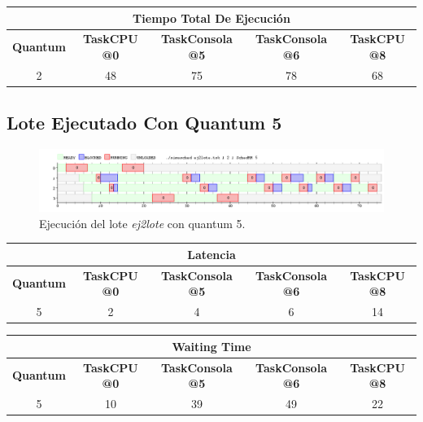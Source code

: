 \begin{center}
	\begin{tabular}{|c|c|c|c|c|}
		\hline
		\multicolumn{5}{|c|}{\large{\textbf{Tiempo Total De Ejecución}}} \\
		\hline
		\textbf{Quantum} & \textbf{TaskCPU @0} & \textbf{TaskConsola @5} & \textbf{TaskConsola @6} & \textbf{TaskCPU @8} \\
		\hline
		2 & 48 & 75 & 78 & 68 \\
		\hline
	\end{tabular}
\end{center}

\subsection{Lote Ejecutado Con Quantum 5}

\begin{figure}[!h]
	\begin{center}
		\includegraphics[width=500px]{imagenes/ej5_5.png}
		\caption{Ejecución del lote \emph{ej2lote} con quantum 5.}
		\label{fig:grafico_ej5_5}
	\end{center}
\end{figure}

\begin{center}
	\begin{tabular}{|c|c|c|c|c|}
		\hline
		\multicolumn{5}{|c|}{\large{\textbf{Latencia}}} \\
		\hline
		\textbf{Quantum} & \textbf{TaskCPU @0} & \textbf{TaskConsola @5} & \textbf{TaskConsola @6} & \textbf{TaskCPU @8} \\
		\hline
		5 & 2 & 4 & 6 & 14 \\
		\hline
	\end{tabular}
\end{center}

\begin{center}
	\begin{tabular}{|c|c|c|c|c|}
		\hline
		\multicolumn{5}{|c|}{\large{\textbf{Waiting Time}}} \\
		\hline
		\textbf{Quantum} & \textbf{TaskCPU @0} & \textbf{TaskConsola @5} & \textbf{TaskConsola @6} & \textbf{TaskCPU @8} \\
		\hline
		5 & 10 & 39 & 49 & 22 \\
		\hline
	\end{tabular}
\end{center}

